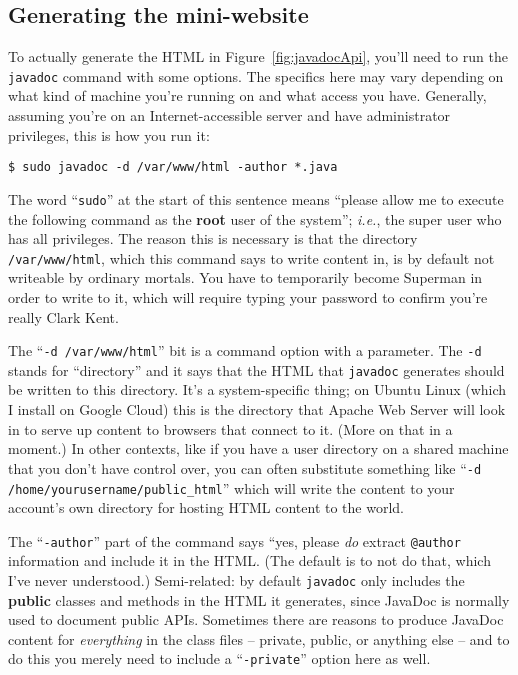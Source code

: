 \subsection{Generating the mini-website}


To actually generate the HTML in Figure~\ref{fig:javadocApi}, you'll need to
run the \texttt{javadoc} command with some options. The specifics here may vary
depending on what kind of machine you're running on and what access you have.
Generally, assuming you're on an Internet-accessible server and have
administrator privileges, this is how you run it:

\begin{Verbatim}[fontsize=\small,samepage=true,frame=none]
$ sudo javadoc -d /var/www/html -author *.java
\end{Verbatim}

The word ``\texttt{sudo}'' at the start of this sentence means ``please allow
me to execute the following command as the \textbf{root} user of the system'';
\textit{i.e.}, the super user who has all privileges. The reason this is
necessary is that the directory \texttt{/var/www/html}, which this command
says to write content in, is by default not writeable by ordinary mortals. You
have to temporarily become Superman in order to write to it, which will
require typing your password to confirm you're really Clark Kent.

The ``\texttt{-d /var/www/html}'' bit is a command option with a parameter. The
\texttt{-d} stands for ``directory'' and it says that the HTML that
\texttt{javadoc} generates should be written to this directory. It's a
system-specific thing; on Ubuntu Linux (which I install on Google Cloud) this
is the directory that Apache Web Server will look in to serve up content to
browsers that connect to it. (More on that in a moment.) In other contexts,
like if you have a user directory on a shared machine that you don't have
control over, you can often substitute something like ``\texttt{-d
/home/yourusername/public\_html}'' which will write the content to your
account's own directory for hosting HTML content to the world.

The ``\texttt{-author}'' part of the command says ``yes, please \textit{do}
extract \texttt{@author} information and include it in the HTML. (The default
is to not do that, which I've never understood.) Semi-related: by default
\texttt{javadoc} only includes the \textbf{public} classes and methods in the
HTML it generates, since JavaDoc is normally used to document public APIs.
Sometimes there are reasons to produce JavaDoc content for \textit{everything}
in the class files -- private, public, or anything else -- and to do this you
merely need to include a ``\texttt{-private}'' option here as well.

